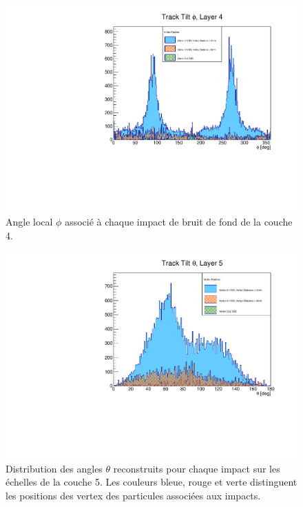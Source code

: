 \begin{appendices}
  \begin{figure}
    \centering
    \includegraphics[scale=0.58]{./figures/Track_Tilts_Beamstrahlung/beamstrahlung_Phi/Track_Tilts_Phi_Layer4.pdf}
    \caption{Angle local $\phi$ associ\'e \`a chaque impact de bruit de fond de la couche 4.}
    \label{fig:phi_Layer4}
  \end{figure}
  
  
  \begin{figure}[!htb]
    \centering
    \includegraphics[scale=0.58]{./figures/Track_Tilts_Beamstrahlung/beamstrahlung_Theta/Track_Tilts_Theta_Layer5.pdf}
    \caption{Distribution des angles $\theta$ reconstruits pour chaque impact sur les \'echelles de la couche 5. Les couleurs bleue, rouge et verte distinguent les positions des vertex des particules associ\'ees aux impacts.}
    \label{fig:theta_Layer5}
  \end{figure}
  

\end{appendices}
